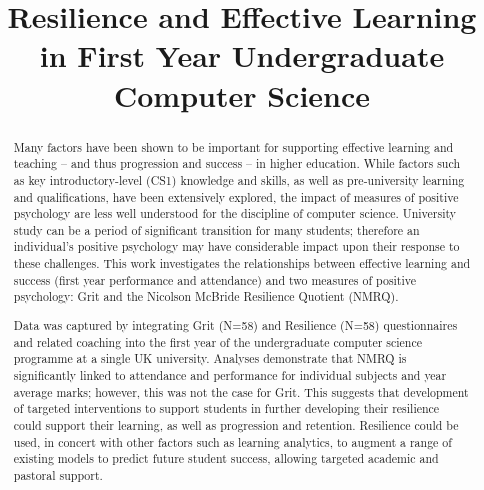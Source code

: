 \documentclass[sigconf]{acmart}
\begin{document}
\title{Resilience and Effective Learning in First Year Undergraduate Computer Science}


\renewcommand{\shortauthors}{}

\begin{abstract}

Many factors have been shown to be important for supporting effective learning and teaching -- and thus progression and success -- in higher education. While factors such as key introductory-level (CS1) knowledge and skills, as well as pre-university learning and qualifications, have been extensively explored, the impact of measures of positive psychology are less well understood for the discipline of computer science. University study can be a period of significant transition for many students; therefore an individual's positive psychology may have considerable impact upon their response to these challenges. This work investigates the relationships between effective learning and success (first year performance and attendance) and two measures of positive psychology: Grit and the Nicolson McBride Resilience Quotient (NMRQ).

Data was captured by integrating Grit (N=58) and Resilience (N=58) questionnaires and related coaching into the first year of the undergraduate computer science programme at a single UK university. Analyses demonstrate that NMRQ is significantly linked to attendance and performance for individual subjects and year average marks; however, this was not the case for Grit. This suggests that development of targeted interventions to support students in further developing their resilience could support their learning, as well as progression and retention. Resilience could be used, in concert with other factors such as learning analytics, to augment a range of existing models to predict future student success, allowing targeted academic and pastoral support.
\end{abstract}
\end{document}
